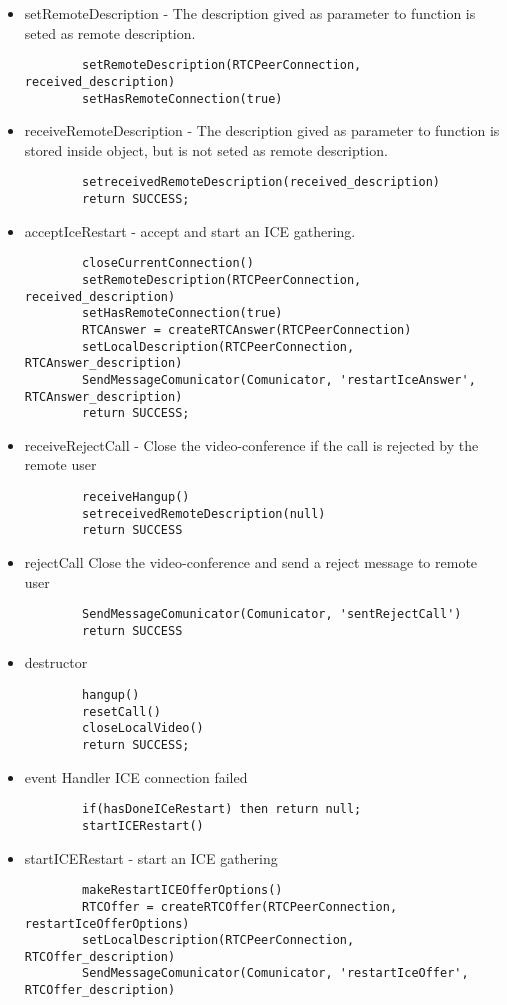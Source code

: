 \begin{itemize}
    \item setRemoteDescription - The description gived as parameter to function is seted as remote description.
    \begin{lstlisting}
        setRemoteDescription(RTCPeerConnection, received_description)
        setHasRemoteConnection(true)
    \end{lstlisting}
    \item receiveRemoteDescription  - The description gived as parameter to function is stored inside object, but is not seted as remote description.
    \begin{lstlisting}
        setreceivedRemoteDescription(received_description)
        return SUCCESS;
    \end{lstlisting}
    \item acceptIceRestart - accept and start an ICE gathering.
    \begin{lstlisting}
        closeCurrentConnection()
        setRemoteDescription(RTCPeerConnection, received_description)
        setHasRemoteConnection(true)
        RTCAnswer = createRTCAnswer(RTCPeerConnection)
        setLocalDescription(RTCPeerConnection, RTCAnswer_description)
        SendMessageComunicator(Comunicator, 'restartIceAnswer', RTCAnswer_description)
        return SUCCESS;
    \end{lstlisting}
    \item receiveRejectCall - Close the video-conference if the call is rejected by the remote user
    \begin{lstlisting}
        receiveHangup()
        setreceivedRemoteDescription(null)
        return SUCCESS
    \end{lstlisting}
    \item rejectCall Close the video-conference and send a reject message to remote user
    \begin{lstlisting}
        SendMessageComunicator(Comunicator, 'sentRejectCall')
        return SUCCESS
    \end{lstlisting}
    \item destructor
    \begin{lstlisting}
        hangup()
        resetCall()
        closeLocalVideo()
        return SUCCESS;
    \end{lstlisting}
    \item event Handler ICE connection failed
    \begin{lstlisting}
        if(hasDoneICeRestart) then return null;
        startICERestart()
    \end{lstlisting}
    \item startICERestart - start an ICE gathering
    \begin{lstlisting}
        makeRestartICEOfferOptions()
        RTCOffer = createRTCOffer(RTCPeerConnection, restartIceOfferOptions)
        setLocalDescription(RTCPeerConnection, RTCOffer_description)
        SendMessageComunicator(Comunicator, 'restartIceOffer', RTCOffer_description)
    \end{lstlisting}
\end{itemize}
